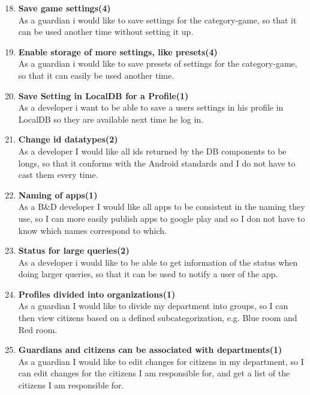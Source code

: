 \begin{enumerate}
	\setcounter{enumi}{17} %
	\item \textbf{Save game settings(4)}\\
	As a guardian i would like to save settings for the category-game, so that it can be used another time without setting it up.
	
	\item \textbf{Enable storage of more settings, like presets(4)}\\
	As a guardian i would like to save presets of settings for the category-game, so that it can easily be used another time. 
	
	\item \textbf{Save Setting in LocalDB for a Profile(1)}\\
	As a developer i want to be able to save a users settings in his profile in LocalDB so they are available next time he log in.
	
	\item \textbf{Change id datatypes(2)}\\
	As a developer I would like all ids returned by the DB components to be longs, so that it conforms with the Android standards and I do not have to cast them every time.
	
	\item \textbf{Naming of apps(1)}\\
	As a B\&D developer I would like all apps to be consistent in the naming they use, so I can more easily publish apps to google play and so I don not have to know which names correspond to which. 
	
	\item \textbf{Status for large queries(2)}\\
	As a developer i would like to be able to get information of the status when doing larger queries, so that it can be used to notify a user of the app.
	
	\item \textbf{Profiles divided into organizations(1)}\\
	As a guardian I would like to divide my department into groups, so I can then view citizens based on a defined subcategorization, e.g. Blue room and Red room.
	
	\item \textbf{Guardians and citizens can be associated with departments(1)}\\
	As a guardian I would like to edit changes for citizens in my department, so I can edit changes for the citizens I am responsible for, and get a list of the citizens I am responsible for.
	

\end{enumerate}
